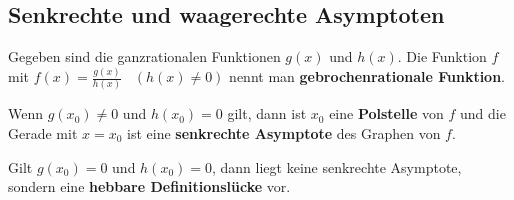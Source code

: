 \documentclass{article}
\begin{document}
\subsection{Senkrechte und waagerechte Asymptoten}

Gegeben sind die ganzrationalen Funktionen $g(x)$ und
$h(x)$. Die Funktion $f$ mit $\displaystyle f(x) = \frac{g(x)}{h(x)}\;\;\;(h(x)\not= 0)$
nennt man \textbf{gebrochenrationale Funktion}.

Wenn $g\left(x_0\right) \not= 0$ und $h\left(x_0\right) = 0$ gilt,
dann ist $x_0$ eine \textbf{Polstelle} von $f$ und die Gerade mit
$x=x_0$ ist eine \textbf{senkrechte Asymptote} des Graphen von $f$.

Gilt $g\left(x_0\right) = 0$ und $h\left(x_0\right) = 0$,
dann liegt keine senkrechte Asymptote, sondern eine \textbf{hebbare Definitionslücke} vor.
\end{document}
